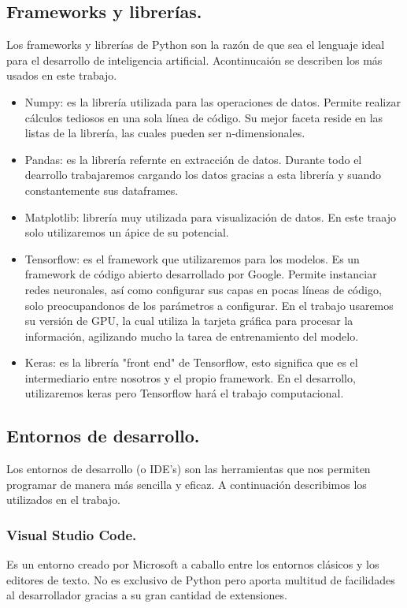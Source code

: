\documentclass[a4paper,10pt]{article}
\begin{document}
\subsection{Frameworks y librerías.}
Los frameworks y librerías de Python son la razón de que sea el lenguaje ideal para el desarrollo de inteligencia artificial. Acontinucaión se describen los más usados en este trabajo.
\begin{itemize}
\item Numpy: es la librería utilizada para las operaciones de datos. Permite realizar cálculos tediosos en una sola línea de código. Su mejor faceta reside en las listas de la librería, las cuales pueden ser n-dimensionales.
\item Pandas: es la librería refernte en extracción de datos. Durante todo el dearrollo trabajaremos cargando los datos gracias a esta librería y suando constantemente sus dataframes.
\item Matplotlib: librería muy utilizada para visualización de datos. En este traajo solo utilizaremos un ápice de su potencial.
\item Tensorflow: es el framework que utilizaremos para los modelos. Es un framework de código abierto desarrollado por Google. Permite instanciar redes neuronales, así como configurar sus capas en pocas líneas de código, solo preocupandonos de los parámetros a configurar. En el trabajo usaremos su versión de GPU, la cual utiliza la tarjeta gráfica para procesar la información, agilizando mucho la tarea de entrenamiento del modelo.
\item Keras: es la librería "front end"  de Tensorflow, esto significa que es el intermediario entre nosotros y el propio framework. En el desarrollo, utilizaremos keras pero Tensorflow hará el trabajo  computacional.
\end{itemize}

\subsection{Entornos de desarrollo.}
Los entornos de desarrollo (o IDE's) son las herramientas que nos permiten programar de manera más sencilla y eficaz. A continuación describimos los utilizados en el trabajo.
\subsubsection{Visual Studio Code.}
Es un entorno creado por Microsoft a caballo entre los entornos clásicos y los editores de texto. No es exclusivo de Python pero aporta multitud de facilidades al desarrollador gracias a su gran cantidad de extensiones.
\end{document}
